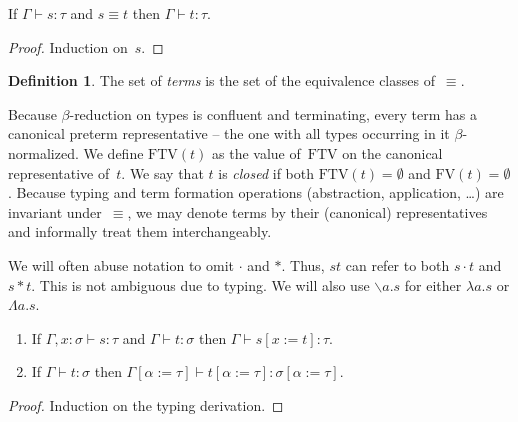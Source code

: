 \documentclass[a4paper,UKenglish,cleveref,autoref,numberwithinsect]{lipics-v2019}
\theoremstyle{definition}
\newtheorem{defn}[theorem]{Definition}
\newcommand{\abstraction}[2]{\backslash #1.#2}
\newcommand{\app}[2]{#1 \cdot #2}
\newcommand{\tapp}[2]{#1 * #2}
\newcommand{\subst}[2]{#1:=#2}
\newcommand{\abs}[2]{\lambda #1.#2}
\newcommand{\tabs}[2]{\Lambda #1.#2}
\newcommand{\FTV}{\mathrm{FTV}}
\newcommand{\FV}{\mathrm{FV}}
\newcommand{\proves}{\vdash}
\begin{document}
\begin{lemma}
  If $\Gamma \vdash s : \tau$ and $s \equiv t$ then $\Gamma \vdash t :
  \tau$.
\end{lemma}

\begin{proof}
  Induction on~$s$.
\end{proof}

\begin{defn}\label{def_terms}
  The set of \emph{terms} is the set of the equivalence classes
  of~$\equiv$.
\end{defn}

Because $\beta$-reduction on types is confluent and terminating, every
term has a canonical preterm representative -- the one with all types
occurring in it $\beta$-normalized.
We define $\FTV(t)$
as the value of~$\FTV$ on the canonical representative of~$t$.
We say that $t$ is \emph{closed} if both $\FTV(t) = \emptyset$
and $\FV(t) = \emptyset$.
%
Because typing and term formation operations (abstraction,
application, \ldots) are invariant under~$\equiv$, we may denote terms
by their (canonical) representatives and informally treat them
interchangeably.

We will often abuse notation to omit $\cdot$ and $*$. Thus, $s t$ can
refer to both $\app{s}{t}$ and $\tapp{s}{t}$. This is not ambiguous
due to typing. We will also use $\abstraction{a}{s}$ for either
$\abs{a}{s}$ or $\tabs{a}{s}$.

\begin{lemma}\label{lem:substitution}
  \begin{enumerate}
  \item If $\Gamma, x : \sigma \proves s : \tau$ and $\Gamma \proves t
    : \sigma$ then $\Gamma \proves s[\subst{x}{t}] : \tau$.
  \item If $\Gamma \proves t : \sigma$ then
    $\Gamma[\subst{\alpha}{\tau}] \proves t[\subst{\alpha}{\tau}] :
    \sigma[\subst{\alpha}{\tau}]$.
  \end{enumerate}
\end{lemma}

\begin{proof}
  Induction on the typing derivation.
\end{proof}
\end{document}
